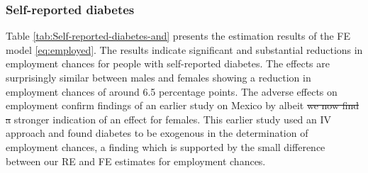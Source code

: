 \documentclass[12pt,english,british]{article}
\providecommand{\DIFaddtex}[1]{{\protect\color{blue}\uwave{#1}}} %
\providecommand{\DIFdeltex}[1]{{\protect\color{red}\sout{#1}}}                      %
\providecommand{\DIFaddbegin}{} %
\providecommand{\DIFaddend}{} %
\providecommand{\DIFdelbegin}{} %
\providecommand{\DIFdelend}{} %
\providecommand{\DIFadd}[1]{\texorpdfstring{\DIFaddtex{#1}}{#1}} %
\providecommand{\DIFdel}[1]{\texorpdfstring{\DIFdeltex{#1}}{}} %
\begin{document}
\subsubsection*{Self-reported diabetes}

Table \ref{tab:Self-reported-diabetes-and} presents the estimation
results of the \ac{FE} model \ref{eq:employed}.
The results indicate significant and substantial reductions in employment
chances for people with self-reported diabetes. The effects are surprisingly similar between males and females showing a reduction in
employment chances of around 6.5 percentage points. The adverse effects on employment confirm findings of an earlier study on Mexico by \cite{Seuring2015} albeit \DIFdelbegin \DIFdel{we now find a }\DIFdelend \DIFaddbegin \DIFadd{with a now }\DIFaddend stronger indication of an effect for females. This earlier study used an \ac{IV} approach and found diabetes to be exogenous in the determination of employment chances, a finding which is supported by the small difference between our \ac{RE} and \ac{FE} estimates for employment chances.
\end{document}
